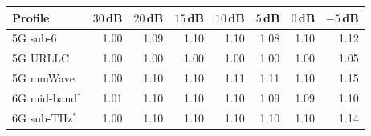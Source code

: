 \begin{tabular}{@{}lrrrrrrr@{}}
\toprule
Profile & $30$\,dB & $20$\,dB & $15$\,dB & $10$\,dB & $5$\,dB & $0$\,dB & $-5$\,dB \\
\midrule
5G sub-6 & 1.00 & 1.09 & 1.10 & 1.10 & 1.08 & 1.10 & 1.12 \\
5G URLLC & 1.00 & 1.00 & 1.00 & 1.00 & 1.00 & 1.00 & 1.05 \\
5G mmWave & 1.00 & 1.10 & 1.10 & 1.11 & 1.11 & 1.10 & 1.15 \\
6G mid-band$^\ast$ & 1.01 & 1.10 & 1.10 & 1.10 & 1.09 & 1.09 & 1.10 \\
6G sub-THz$^\ast$ & 1.00 & 1.10 & 1.10 & 1.10 & 1.10 & 1.10 & 1.14 \\
\bottomrule
\end{tabular}
